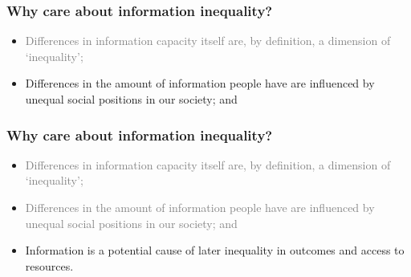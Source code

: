\documentclass[pdf]{beamer}
\begin{document}
  \begin{frame}
  \frametitle{Why care about information inequality?}
    \begin{itemize}

    \item
    \textcolor{gray}{Differences in information capacity itself are, by definition, a
      dimension of `inequality';}
    \item
      Differences in the amount of information people have are influenced by
      unequal social positions in our society; and


    \end{itemize}
  \end{frame}

  \begin{frame}
  \frametitle{Why care about information inequality?}
    \begin{itemize}
    \item
      \textcolor{gray}{Differences in information capacity itself are, by definition, a
      dimension of `inequality';}
    \item
      \textcolor{gray}{Differences in the amount of information people have are influenced by
      unequal social positions in our society; and}
    \item
      Information is a potential cause of later inequality in outcomes and
      access to resources.

    \end{itemize}
  \end{frame}


\end{document}
